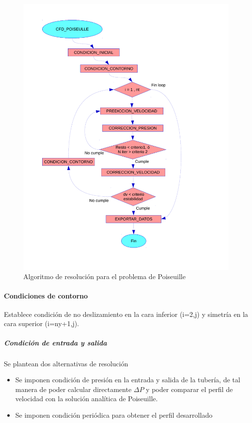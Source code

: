 \begin{center}
\begin{figure}
\includegraphics[width=1\textwidth]{diagrama_flujo_1.pdf}
\caption{Algoritmo de resolución para el problema de Poiseuille} \label{algoritmo}
\end{figure}
\end{center}

\paragraph{Condiciones de contorno} Establece condición de no deslizamiento en la cara inferior (i=2,j) y simetría en la cara superior (i=ny+1,j). 

\subparagraph{Condición de entrada y salida} Se plantean dos alternativas de resolución
\begin{itemize}
\item Se imponen condición de presión en la entrada y salida de la tubería, de tal manera de poder calcular directamente $\Delta P$ y poder comparar el perfil de velocidad con la solución analítica de Poiseuille.
\item Se imponen condición periódica para obtener el perfil desarrollado
\end{itemize}
